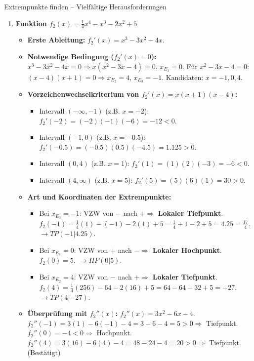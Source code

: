 \begin{loesungsumgebung}{Extrempunkte finden – Vielfältige Herausforderungen}
\begin{enumerate}[label=(\alph*)]
    \item \textbf{Funktion $f_2(x) = \frac{1}{4}x^4 - x^3 - 2x^2 + 5$}
    \begin{itemize}
        \item \textbf{Erste Ableitung:} $f_2'(x) = x^3 - 3x^2 - 4x$.
        \item \textbf{Notwendige Bedingung ($f_2'(x)=0$):}
        $x^3 - 3x^2 - 4x = 0 \Rightarrow x(x^2 - 3x - 4) = 0$.
        $x_E_1 = 0$.
        Für $x^2 - 3x - 4 = 0$: $(x-4)(x+1)=0 \Rightarrow x_E_2 = 4$, $x_E_3 = -1$.
        Kandidaten: $x=-1, 0, 4$.
        \item \textbf{Vorzeichenwechselkriterium von $f_2'(x) = x(x+1)(x-4)$:}
        \begin{itemize}
            \item Intervall $(-\infty, -1)$ (z.B. $x=-2$): $f_2'(-2) = (-2)(-1)(-6) = -12 < 0$.
            \item Intervall $(-1, 0)$ (z.B. $x=-0.5$): $f_2'(-0.5) = (-0.5)(0.5)(-4.5) = 1.125 > 0$.
            \item Intervall $(0, 4)$ (z.B. $x=1$): $f_2'(1) = (1)(2)(-3) = -6 < 0$.
            \item Intervall $(4, \infty)$ (z.B. $x=5$): $f_2'(5) = (5)(6)(1) = 30 > 0$.
        \end{itemize}
        \item \textbf{Art und Koordinaten der Extrempunkte:}
        \begin{itemize}
            \item Bei $x_E_3 = -1$: VZW von $-$ nach $+ \Rightarrow$ \textbf{Lokaler Tiefpunkt}.
            $f_2(-1) = \frac{1}{4}(1) - (-1) - 2(1) + 5 = \frac{1}{4} + 1 - 2 + 5 = 4.25 = \frac{17}{4}$.
            $\rightarrow TP(-1|4.25)$.
            \item Bei $x_E_1 = 0$: VZW von $+$ nach $- \Rightarrow$ \textbf{Lokaler Hochpunkt}.
            $f_2(0) = 5$.
            $\rightarrow HP(0|5)$.
            \item Bei $x_E_2 = 4$: VZW von $-$ nach $+ \Rightarrow$ \textbf{Lokaler Tiefpunkt}.
            $f_2(4) = \frac{1}{4}(256) - 64 - 2(16) + 5 = 64 - 64 - 32 + 5 = -27$.
            $\rightarrow TP(4|-27)$.
        \end{itemize}
        \item \textbf{Überprüfung mit $f_2''(x)$:}
        $f_2''(x) = 3x^2 - 6x - 4$.
        $f_2''(-1) = 3(1) - 6(-1) - 4 = 3+6-4 = 5 > 0 \Rightarrow$ Tiefpunkt.
        $f_2''(0) = -4 < 0 \Rightarrow$ Hochpunkt.
        $f_2''(4) = 3(16) - 6(4) - 4 = 48 - 24 - 4 = 20 > 0 \Rightarrow$ Tiefpunkt. (Bestätigt)
    \end{itemize}


\end{enumerate}
\end{loesungsumgebung}
